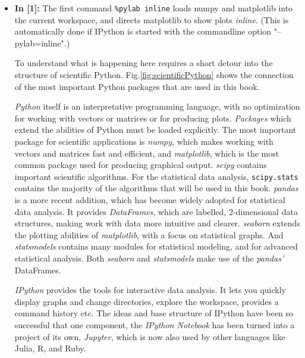 \begin{itemize}
  \item \textbf{In [1]:} The first command \lstinline{%pylab inline} loads numpy and matplotlib into the current workspace, and directs matplotlib to show plots \emph{inline}. (This is automatically done if IPython is started with the commandline option "--pylab=inline".)

    To understand what is happening here requires a short detour into the structure of scientific Python. Fig.\ref{fig:scientificPython} shows the connection of the most important Python packages that are used in this book.

    \emph{Python} itself is an interpretative programming language, with no optimization for working with vectors or matrices or for producing plots. \emph{Packages} which extend the abilities of Python must be loaded explicitly. The most important package for scientific applications is \emph{numpy}, which makes working with vectors and matrices fast and efficient, and \emph{matplotlib}, which is the most common package used for producing graphical output. \emph{scipy} contains important scientific algorithms. For the statistical data analysis, \lstinline{scipy.stats} contains the majority of the algorithms that will be used in this book. \emph{pandas} is a more recent addition, which has become widely adopted for statistical data analysis. It provides \emph{DataFrames}, which are labelled, 2-dimensional data structures, making work with data more intuitive and clearer. \emph{seaborn} extends the plotting abilities of \emph{matplotlib}, with a focus on statistical graphs. And \emph{statsmodels} contains many modules for statistical modeling, and for advanced statistical analysis. Both \emph{seaborn} and \emph{statsmodels} make use of the \emph{pandas'} DataFrames.

    \emph{IPython} provides the tools for interactive data analysis. It lets you quickly display graphs and change directories, explore the workspace, provides a command history etc. The ideas and base structure of IPython have been so successful that one component, the \emph{IPython Notebook} has been turned into a project of its own, \emph{Jupyter}, which is now also used by other languages like Julia, R, and Ruby.


\end{itemize}
